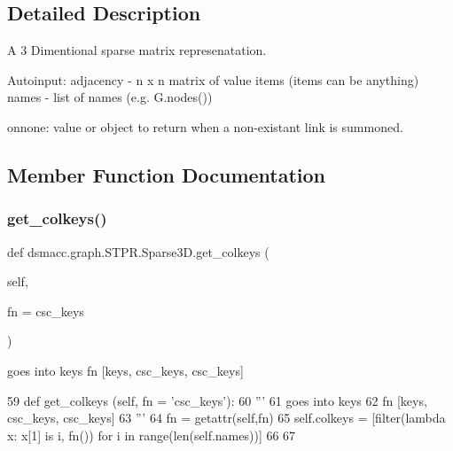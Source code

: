 \subsection{Detailed Description}
\begin{DoxyVerb}A 3 Dimentional sparse matrix represenatation.

Autoinput:
    adjacency - n x n matrix of value items (items can be anything)
    names - list of names (e.g. G.nodes())

onnone:
    value or object to return when a non-existant link is summoned.
\end{DoxyVerb}
 

\subsection{Member Function Documentation}
\mbox{\label{classdsmacc_1_1graph_1_1STPR_1_1Sparse3D_ac87c5e48b0a4b67709a9249423398660}} 
\subsubsection{\texorpdfstring{get\+\_\+colkeys()}{get\_colkeys()}}
{\footnotesize\ttfamily def dsmacc.\+graph.\+S\+T\+P\+R.\+Sparse3\+D.\+get\+\_\+colkeys (\begin{DoxyParamCaption}\item[{}]{self,  }\item[{}]{fn = {\ttfamily \textquotesingle{}csc\+\_\+keys\textquotesingle{}} }\end{DoxyParamCaption})}

\begin{DoxyVerb}goes into keys
fn [keys, csc_keys, csc_keys]
\end{DoxyVerb}
 
\begin{DoxyCode}
59       \textcolor{keyword}{def }get\_colkeys (self, fn = 'csc\_keys'):
60           \textcolor{stringliteral}{'''}
61 \textcolor{stringliteral}{          goes into keys}
62 \textcolor{stringliteral}{          fn [keys, csc\_keys, csc\_keys]}
63 \textcolor{stringliteral}{          '''}
64           fn = getattr(self,fn)
65           self.colkeys = [filter(\textcolor{keyword}{lambda} x: x[1] \textcolor{keywordflow}{is} i, fn()) \textcolor{keywordflow}{for} i \textcolor{keywordflow}{in} range(len(self.names))]
66       
67       
\end{DoxyCode}
\mbox{\label{classdsmacc_1_1graph_1_1STPR_1_1Sparse3D_a14328eb65ee83cc72f0b22b85100818d}} 
